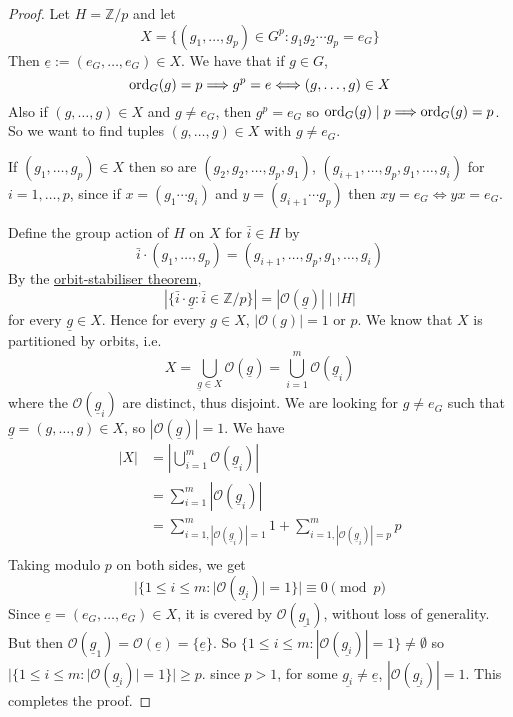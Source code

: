 \begin{proof}
	Let $H = \mathbb{Z} / p$ and let
	\[
		X = \{ (g_1, \dots, g_p) \in G^p: g_1 g_2 \cdots g_p = e_G \}
	\]
	Then $\underline{e} := (e_G, \dots, e_G) \in X$. We have that if $g \in G$,
	\[
		\text{ord}_G(g) = p \Longrightarrow g^p = e \Longleftrightarrow (g, \dots, g) \in X
	\]
	Also if $(g, \dots, g) \in X$ and $g \ne e_G$, then $g^p = e_G$ so $\text{ord}_G(g) \mid p \Longrightarrow \text{ord}_G(g) = p$. So we want to find tuples $(g, \dots, g) \in X$ with $g \ne e_G$.

	If $(g_1, \dots, g_p) \in X$ then so are $(g_2, g_2, \dots, g_p, g_1)$, $(g_{i + 1}, \dots, g_p, g_1, \dots, g_i)$ for $i = 1, \dots, p$, since if $x = (g_1 \cdots g_i)$ and $y = (g_{i + 1} \cdots g_p)$ then $xy = e_G \Longleftrightarrow yx = e_G$.

	Define the group action of $H$ on $X$ for $\bar{i} \in H$ by
	\[
		\bar{i} \cdot (g_1, \dots, g_p) = (g_{i + 1}, \dots, g_p, g_1, \dots, g_i)
	\]
	By the \hyperref[thm:orbitStabiliser]{orbit-stabiliser theorem},
	\[
		|\{ \bar{i} \cdot \underline{g}: \bar{i} \in \mathbb{Z} / p \}| = |\mathcal{O}(\underline{g})| \mid |H|
	\]
	for every $\underline{g} \in X$. Hence for every $g \in X$, $|\mathcal{O}(g)| = 1$ or $p$. We know that $X$ is partitioned by orbits, i.e.
	\[
		X = \bigcup_{\underline{g} \in X} \mathcal{O}(\underline{g}) = \bigcup_{i = 1}^m \mathcal{O}(\underline{g}_i)
	\]
	where the $\mathcal{O}(\underline{g}_i)$ are distinct, thus disjoint. We are looking for $g \ne e_G$ such that $\underline{g} = (g, \dots, g) \in X$, so $|\mathcal{O}(\underline{g})| = 1$. We have
	\[
		\begin{aligned}
			|X| & = \left| \bigcup_{i = 1}^m \mathcal{O}(\underline{g}_i) \right| \\
			& = \sum_{i = 1}^m |\mathcal{O}(\underline{g}_i)| \\
			& = \sum_{i = 1, |\mathcal{O}(\underline{g}_i)| = 1}^m 1 + \sum_{i = 1, |\mathcal{O}(\underline{g}_i)| = p}^m p \\
		\end{aligned}
	\]
	Taking modulo $p$ on both sides, we get
	\[
		|\{ 1 \le i \le m: |\mathcal{O}(\underline{g_i})| = 1 \}| \equiv 0 \pmod{p}
	\]
	Since $\underline{e} = (e_G, \dots, e_G) \in X$, it is cvered by $\mathcal{O}(\underline{g_1})$, without loss of generality. But then $\mathcal{O}(\underline{g}_1) = \mathcal{O}(\underline{e}) = \{ \underline{e} \}$. So $\{ 1 \le i \le m: |\mathcal{O}(\underline{g_i})| = 1 \} \ne \emptyset$ so $|\{ 1 \le i \le m: |\mathcal{O}(\underline{g_i})| = 1 \}| \ge p$. since $p > 1$, for some $\underline{g_i} \ne \underline{e}$, $|\mathcal{O}(\underline{g_i})| = 1$. This completes the proof.
\end{proof}


